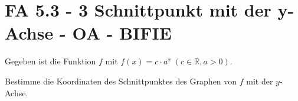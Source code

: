 \section{FA 5.3 - 3 Schnittpunkt mit der y-Achse - OA - BIFIE}

\begin{beispiel}[FA 5.3]{1} %
Gegeben ist die Funktion $f$ mit $f(x)=c\cdot a^x ~ (c\in \mathbb{R}, a>0)$.
\leer

Bestimme die Koordinaten des Schnittpunktes des Graphen von $f$ mit der $y$-Achse.

\end{beispiel}